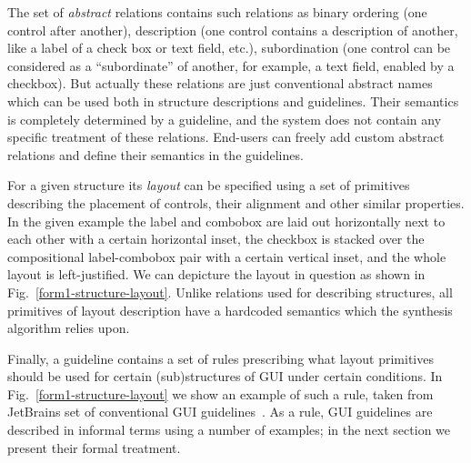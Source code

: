The set of \emph{abstract} relations contains such relations as binary ordering (one control after another), description (one
control contains a description of another, like a label of a check box or text field, etc.), subordination (one control can
be considered as a ``subordinate'' of another, for example, a text field, enabled by a checkbox). But actually these
relations are just conventional abstract names which can be used both in structure descriptions and guidelines. Their
semantics is completely determined by a guideline, and the system does not contain any specific treatment of
these relations. End-users can freely add custom abstract relations and define their semantics in the guidelines.

For a given structure its \emph{layout} can be specified using a set of primitives describing the placement
of controls, their alignment and other similar properties. In the given example the label and combobox are
laid out horizontally next to each other with a certain horizontal inset, the checkbox is stacked over the compositional
label-combobox pair with a certain vertical inset, and the whole layout is left-justified. We can depicture the
layout in question as shown in Fig.~\ref{form1-structure-layout}. Unlike relations used for
describing structures, all primitives of layout description have a hardcoded semantics which the
synthesis algorithm relies upon.

Finally, a guideline contains a set of rules prescribing what layout primitives should be used for
certain (sub)structures of GUI under certain conditions. In Fig.~\ref{form1-structure-layout}
we show an example of such a rule, taken from JetBrains set of conventional GUI guidelines~\cite{JBG}.
As a rule, GUI guidelines are described in informal terms using a number of examples; in the next section
we present their formal treatment.



